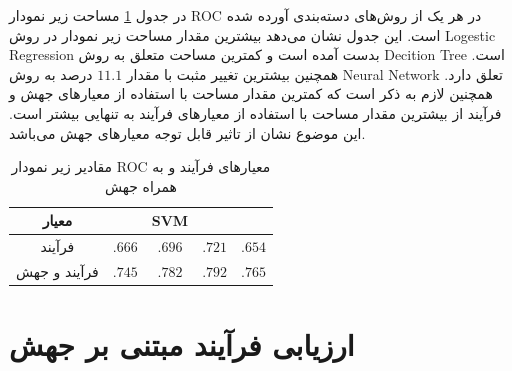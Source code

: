 در جدول \ref{tab:auc-phase1} مساحت زیر نمودار ROC در هر یک از روش‌های دسته‌بندی آورده شده است. این جدول نشان می‌دهد بیشترین مقدار مساحت زیر نمودار در روش Logestic Regression بدست آمده است و کمترین مساحت متعلق به روش Decition Tree است. همچنین بیشترین تغییر مثبت با مقدار $11.1$ درصد به روش Neural Network تعلق دارد. همچنین لازم به ذکر است که کمترین مقدار مساحت با استفاده از معیارهای جهش و فرآیند از بیشترین مقدار مساحت با استفاده از معیارهای فرآیند به تنهایی بیشتر است. این موضوع نشان از تاثیر قابل توجه معیارهای جهش می‌باشد. 

\begin{table}[H] 
	\renewcommand*{\arraystretch}{1.2}	
	\centering \caption{مقادیر زیر نمودار ROC معیارهای فرآیند و به همراه جهش}
	\label{tab:auc-phase1}
	\begin{tabular}{|c|c|c|c|c|}
		\hline
		\hline
		معیار & 
		 \lr{ Decition Tree} & SVM &\lr{ Logestic Regression} &\lr{ Neural Network} \\
		 \hline
		 \hline
		 فرآیند & $.666$ & $.696$ & $.721$ & $.654$
		 \\
		 \hline
		 فرآیند و جهش  & $.745$ & $.782$ & $.792$ & $.765$
		 \\
		 \hline
		 
	\end{tabular}
\end{table}

\section{ارزیابی فرآیند مبتنی بر جهش }
